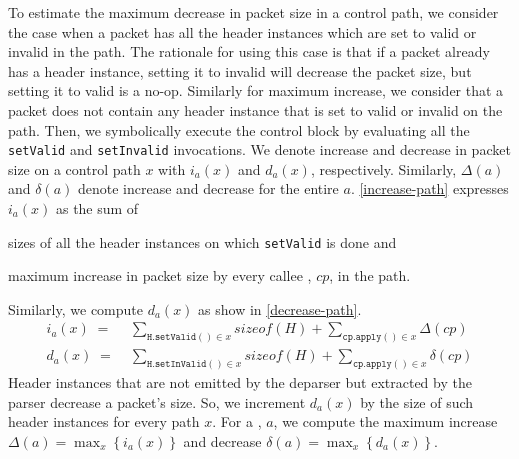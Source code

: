 \documentclass[letterpaper,twocolumn,10pt]{article}
\begin{document}



To estimate the maximum decrease in packet size in a control path, we
consider the case when a packet has all the header instances
which are set to valid or invalid in the path. The rationale for using
this case is that if a packet already has a header instance, setting
it to invalid will decrease the packet size, but setting it to valid
is a no-op.  Similarly for maximum increase, we consider that a packet
does not contain any header instance that is set to valid or invalid
on the path. Then, we symbolically execute the control block by
evaluating all the \texttt{setValid} and \texttt{setInvalid}
invocations.  We denote increase and decrease in packet size on a
control path $x$ with $i_{a}(x)$ and $d_{a}(x)$, respectively.
Similarly, $\Delta(a)$ and $\delta(a)$ denote increase and decrease
for the entire \uprogram $a$.  \cref{increase-path} expresses
$i_{a}(x)$ as the sum of
\begin{enumerate*}[label=(\roman*)]
  \item sizes of all the header instances on which \texttt{setValid}
    is done and
  \item maximum increase in packet size by every callee \uprogram,
    $cp$, in the path.
\end{enumerate*}
Similarly, we compute $d_{a}(x)$ as show in \cref{decrease-path}.
\begin{align}
  i_{a}(x)\; =& \; \sum_{\mathtt{H.setValid()} \in x} sizeof(H) +
  \sum_{\mathtt{cp.apply()} \in x} \Delta(cp) \label{increase-path} \\
  d_{a}(x)\; =& \; \sum_{\mathtt{H.setInValid()} \in x} sizeof(H) +
  \sum_{\mathtt{cp.apply()} \in x} \delta(cp) \label{decrease-path}
\end{align}
Header instances that are not emitted by the deparser but extracted by
the parser decrease a packet's size. So, we increment $d_{a}(x)$ by
the size of such header instances for every path $x$.
For a \uprogram, $a$, we compute the maximum increase $\Delta(a) = 
\max_{x} \left\{ i_{a}(x) \right\} $ and decrease $\delta(a) = 
\max_{x} \left\{ d_{a}(x) \right\}$.
\end{document}
